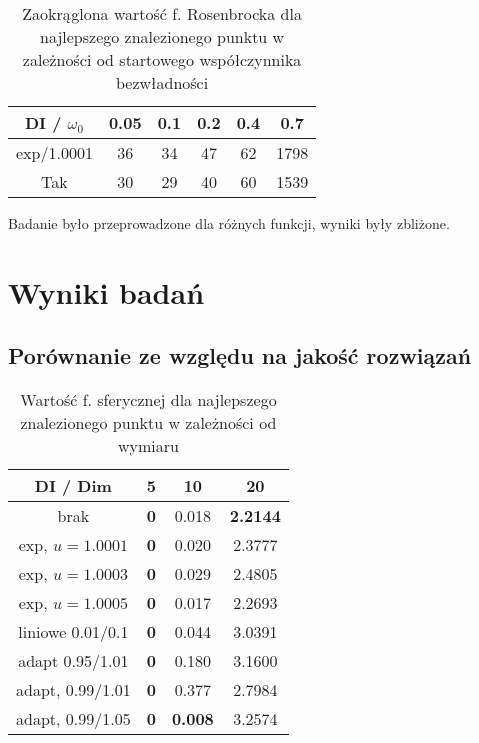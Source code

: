 \documentclass[12pt]{article}
\begin{document}
\begin{table}[h]
	\centering
	\begin{tabular}{|c|c|c|c|c|c|}
		\hline
		DI / $\omega_0$ & 0.05 & 0.1 & 0.2 & 0.4 & 0.7  \\
		\hline
		exp/1.0001      & 36   & 34  & 47  & 62  & 1798 \\
		Tak             & 30   & 29  & 40  & 60  & 1539 \\
		\hline
	\end{tabular}
	\caption{Zaokrąglona wartość f. Rosenbrocka dla najlepszego znalezionego punktu w zależności od startowego współczynnika bezwładności}
	\label{tab:test_rosenbrock}
\end{table}


Badanie było przeprowadzone dla różnych funkcji, wyniki były zbliżone.


\pagebreak
\section{Wyniki badań}
\subsection*{Porównanie ze względu na jakość rozwiązań}

\begin{table}[ht]
	\centering
	\begin{tabular}{|c|c|c|c|}
		\hline
		DI  / Dim        & 5          & 10             & 20              \\
		\hline
		brak             & \textbf{0} & 0.018          & \textbf{2.2144} \\
		exp, $u=1.0001$  & \textbf{0} & 0.020          & 2.3777          \\
		exp, $u=1.0003$  & \textbf{0} & 0.029          & 2.4805          \\
		exp, $u=1.0005$  & \textbf{0} & 0.017          & 2.2693          \\
		liniowe 0.01/0.1 & \textbf{0} & 0.044          & 3.0391          \\
		adapt 0.95/1.01  & \textbf{0} & 0.180          & 3.1600          \\
		adapt, 0.99/1.01 & \textbf{0} & 0.377          & 2.7984          \\
		adapt, 0.99/1.05 & \textbf{0} & \textbf{0.008} & 3.2574          \\
		\hline
	\end{tabular}
	\caption{Wartość f. sferycznej dla najlepszego znalezionego punktu w zależności od wymiaru}
	\label{tab:sphere_values}
\end{table}
\end{document}
